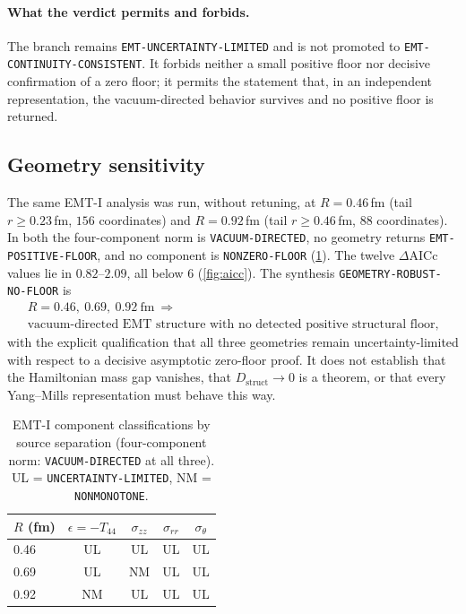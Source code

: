 \documentclass[11pt,a4paper]{article}
\theoremstyle{definition}
\theoremstyle{remark}
\newcommand{\Dstruct}{D_{\mathrm{struct}}}
\begin{document}
\paragraph{What the verdict permits and forbids.} The branch remains \texttt{EMT-\allowbreak{}UNCERTAINTY-\allowbreak{}LIMITED} and is not promoted to \texttt{EMT-\allowbreak{}CONTINUITY-\allowbreak{}CONSISTENT}. It forbids neither a small positive floor nor decisive confirmation of a zero floor; it permits the statement that, in an independent representation, the vacuum-directed behavior survives and no positive floor is returned.

\subsection{Geometry sensitivity}\label{ssec:geom}
The same EMT-I analysis was run, without retuning, at $R=0.46$\,fm (tail $r\ge0.23$\,fm, $156$ coordinates) and $R=0.92$\,fm (tail $r\ge0.46$\,fm, $88$ coordinates). In both the four-component norm is \texttt{VACUUM-\allowbreak{}DIRECTED}, no geometry returns \texttt{EMT-\allowbreak{}POSITIVE-\allowbreak{}FLOOR}, and no component is \texttt{NONZERO-\allowbreak{}FLOOR} (\cref{tab:emtcomp}). The twelve $\Delta\mathrm{AICc}$ values lie in $0.82$--$2.09$, all below $6$ (\cref{fig:aicc}). The synthesis \texttt{GEOMETRY-\allowbreak{}ROBUST-\allowbreak{}NO-\allowbreak{}FLOOR} is
\[
\begin{gathered}R=0.46,\ 0.69,\ 0.92\ \text{fm}\ \Longrightarrow\\ \text{vacuum-directed EMT structure with no detected positive structural floor,}\end{gathered}
\]
with the explicit qualification that all three geometries remain uncertainty-limited with respect to a decisive asymptotic zero-floor proof. It does not establish that the Hamiltonian mass gap vanishes, that $\Dstruct\to0$ is a theorem, or that every Yang--Mills representation must behave this way.
\begin{table}[t]
\centering\small
\caption{EMT-I component classifications by source separation (four-component norm: \texttt{VACUUM-\allowbreak{}DIRECTED} at all three). UL = \texttt{UNCERTAINTY-\allowbreak{}LIMITED}, NM = \texttt{NONMONOTONE}.}\label{tab:emtcomp}
\begin{tabular}{@{}lcccc@{}}\toprule $R$ (fm) & $\epsilon=-T_{44}$ & $\sigma_{zz}$ & $\sigma_{rr}$ & $\sigma_\theta$\\\midrule
0.46 & UL & UL & UL & UL\\
0.69 & UL & NM & UL & UL\\
0.92 & NM & UL & UL & UL\\
\bottomrule\end{tabular}
\end{table}
\end{document}
